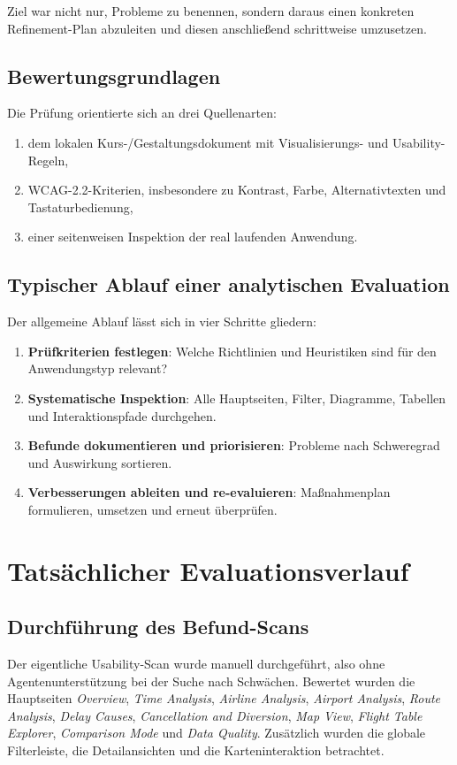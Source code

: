 \documentclass[11pt,a4paper]{article}
\begin{document}
Ziel war nicht nur, Probleme zu benennen, sondern daraus einen konkreten Refinement-Plan abzuleiten und diesen anschließend schrittweise umzusetzen.

\subsection{Bewertungsgrundlagen}
Die Prüfung orientierte sich an drei Quellenarten:

\begin{enumerate}[leftmargin=1.2cm]
\item dem lokalen Kurs-/Gestaltungsdokument mit Visualisierungs- und Usability-Regeln,
\item WCAG-2.2-Kriterien, insbesondere zu Kontrast, Farbe, Alternativtexten und Tastaturbedienung,
\item einer seitenweisen Inspektion der real laufenden Anwendung.
\end{enumerate}

\subsection{Typischer Ablauf einer analytischen Evaluation}
Der allgemeine Ablauf lässt sich in vier Schritte gliedern:

\begin{enumerate}[leftmargin=1.2cm]
\item \textbf{Prüfkriterien festlegen}: Welche Richtlinien und Heuristiken sind für den Anwendungstyp relevant?
\item \textbf{Systematische Inspektion}: Alle Hauptseiten, Filter, Diagramme, Tabellen und Interaktionspfade durchgehen.
\item \textbf{Befunde dokumentieren und priorisieren}: Probleme nach Schweregrad und Auswirkung sortieren.
\item \textbf{Verbesserungen ableiten und re-evaluieren}: Maßnahmenplan formulieren, umsetzen und erneut überprüfen.
\end{enumerate}

\section{Tatsächlicher Evaluationsverlauf}
\subsection{Durchführung des Befund-Scans}
Der eigentliche Usability-Scan wurde manuell durchgeführt, also ohne Agentenunterstützung bei der Suche nach Schwächen. Bewertet wurden die Hauptseiten \textit{Overview}, \textit{Time Analysis}, \textit{Airline Analysis}, \textit{Airport Analysis}, \textit{Route Analysis}, \textit{Delay Causes}, \textit{Cancellation and Diversion}, \textit{Map View}, \textit{Flight Table Explorer}, \textit{Comparison Mode} und \textit{Data Quality}. Zusätzlich wurden die globale Filterleiste, die Detailansichten und die Karteninteraktion betrachtet.
\end{document}
